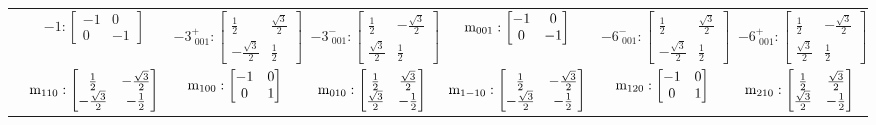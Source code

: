 \documentclass[fleqn,8pt,landscape]{jsarticle}
\begin{document}
\begin{longtable}{ccccccc}
& $ -1:\begin{bmatrix} -1 & 0 \\ 0 & -1 \end{bmatrix} $ & $ -3^{+}_{\,\,001}:\begin{bmatrix} \frac{1}{2} & \frac{\sqrt{3}}{2} \\ - \frac{\sqrt{3}}{2} & \frac{1}{2} \end{bmatrix} $ & $ -3^{-}_{\,\,001}:\begin{bmatrix} \frac{1}{2} & - \frac{\sqrt{3}}{2} \\ \frac{\sqrt{3}}{2} & \frac{1}{2} \end{bmatrix} $ & $ {\rm m}_{001}:\begin{bmatrix} -1 & 0 \\ 0 & -1 \end{bmatrix} $ & $ -6^{-}_{\,\,001}:\begin{bmatrix} \frac{1}{2} & \frac{\sqrt{3}}{2} \\ - \frac{\sqrt{3}}{2} & \frac{1}{2} \end{bmatrix} $ & $ -6^{+}_{\,\,001}:\begin{bmatrix} \frac{1}{2} & - \frac{\sqrt{3}}{2} \\ \frac{\sqrt{3}}{2} & \frac{1}{2} \end{bmatrix} $ \\
& $ {\rm m}_{110}:\begin{bmatrix} \frac{1}{2} & - \frac{\sqrt{3}}{2} \\ - \frac{\sqrt{3}}{2} & - \frac{1}{2} \end{bmatrix} $ & $ {\rm m}_{100}:\begin{bmatrix} -1 & 0 \\ 0 & 1 \end{bmatrix} $ & $ {\rm m}_{010}:\begin{bmatrix} \frac{1}{2} & \frac{\sqrt{3}}{2} \\ \frac{\sqrt{3}}{2} & - \frac{1}{2} \end{bmatrix} $ & $ {\rm m}_{1-10}:\begin{bmatrix} \frac{1}{2} & - \frac{\sqrt{3}}{2} \\ - \frac{\sqrt{3}}{2} & - \frac{1}{2} \end{bmatrix} $ & $ {\rm m}_{120}:\begin{bmatrix} -1 & 0 \\ 0 & 1 \end{bmatrix} $ & $ {\rm m}_{210}:\begin{bmatrix} \frac{1}{2} & \frac{\sqrt{3}}{2} \\ \frac{\sqrt{3}}{2} & - \frac{1}{2} \end{bmatrix} $ \\
\end{longtable}
\end{document}
